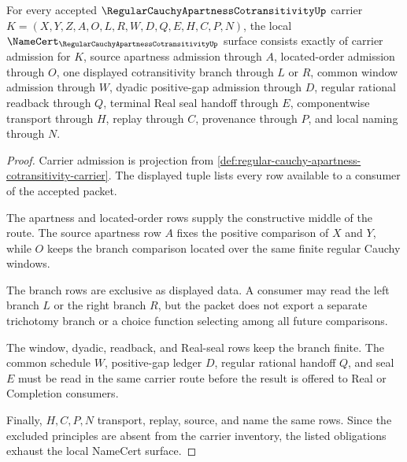 \begin{theorem}
\label{thm:regular-cauchy-apartness-cotransitivity-obligations}
For every accepted $\RegularCauchyApartnessCotransitivityUp$ carrier $K=(X,Y,Z,A,O,L,R,W,D,Q,E,H,C,P,N)$, the local $\NameCert_{\RegularCauchyApartnessCotransitivityUp}$ surface consists exactly of carrier admission for $K$, source apartness admission through $A$, located-order admission through $O$, one displayed cotransitivity branch through $L$ or $R$, common window admission through $W$, dyadic positive-gap admission through $D$, regular rational readback through $Q$, terminal Real seal handoff through $E$, componentwise transport through $H$, replay through $C$, provenance through $P$, and local naming through $N$.
\end{theorem}
\begin{proof}
Carrier admission is projection from \autoref{def:regular-cauchy-apartness-cotransitivity-carrier}. The displayed tuple lists every row available to a consumer of the accepted packet.

The apartness and located-order rows supply the constructive middle of the route. The source apartness row $A$ fixes the positive comparison of $X$ and $Y$, while $O$ keeps the branch comparison located over the same finite regular Cauchy windows.

The branch rows are exclusive as displayed data. A consumer may read the left branch $L$ or the right branch $R$, but the packet does not export a separate trichotomy branch or a choice function selecting among all future comparisons.

The window, dyadic, readback, and Real-seal rows keep the branch finite. The common schedule $W$, positive-gap ledger $D$, regular rational handoff $Q$, and seal $E$ must be read in the same carrier route before the result is offered to Real or Completion consumers.

Finally, $H,C,P,N$ transport, replay, source, and name the same rows. Since the excluded principles are absent from the carrier inventory, the listed obligations exhaust the local NameCert surface.
\end{proof}

